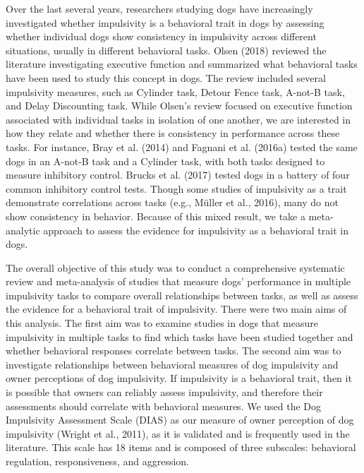 \documentclass[
  ,pub,floatsintext]{apa6}
\begin{document}
Over the last several years, researchers studying dogs have increasingly investigated whether impulsivity is a behavioral trait in dogs by assessing whether individual dogs show consistency in impulsivity across different situations, usually in different behavioral tasks. Olsen (2018) reviewed the literature investigating executive function and summarized what behavioral tasks have been used to study this concept in dogs. The review included several impulsivity measures, such as Cylinder task, Detour Fence task, A-not-B task, and Delay Discounting task. While Olsen's review focused on executive function associated with individual tasks in isolation of one another, we are interested in how they relate and whether there is consistency in performance across these tasks. For instance, Bray et al. (2014) and Fagnani et al. (2016a) tested the same dogs in an A-not-B task and a Cylinder task, with both tasks designed to measure inhibitory control. Brucks et al. (2017) tested dogs in a battery of four common inhibitory control tests. Though some studies of impulsivity as a trait demonstrate correlations across tasks (e.g., Müller et al., 2016), many do not show consistency in behavior. Because of this mixed result, we take a meta-analytic approach to assess the evidence for impulsivity as a behavioral trait in dogs.


The overall objective of this study was to conduct a comprehensive systematic review and meta-analysis of studies that measure dogs' performance in multiple impulsivity tasks to compare overall relationships between tasks, as well as assess the evidence for a behavioral trait of impulsivity. There were two main aims of this analysis. The first aim was to examine studies in dogs that measure impulsivity in multiple tasks to find which tasks have been studied together and whether behavioral responses correlate between tasks. The second aim was to investigate relationships between behavioral measures of dog impulsivity and owner perceptions of dog impulsivity. If impulsivity is a behavioral trait, then it is possible that owners can reliably assess impulsivity, and therefore their assessments should correlate with behavioral measures. We used the Dog Impulsivity Assessment Scale (DIAS) as our measure of owner perception of dog impulsivity (Wright et al., 2011), as it is validated and is frequently used in the literature. This scale has 18 items and is composed of three subscales: behavioral regulation, responsiveness, and aggression.
\end{document}
